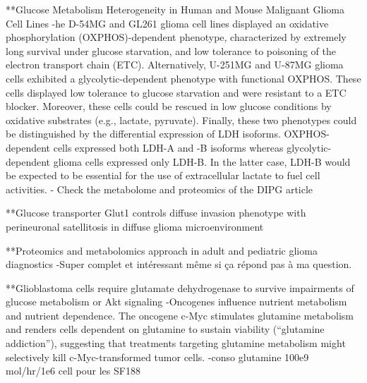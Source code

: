 \documentclass[11pt,a4paper]{article}
\begin{document}
**Glucose Metabolism Heterogeneity in Human and Mouse Malignant Glioma Cell Lines
-he D-54MG and GL261 glioma cell lines displayed an oxidative phosphorylation (OXPHOS)-dependent phenotype, characterized by extremely long survival under glucose starvation, and low tolerance to poisoning of the electron transport chain (ETC). Alternatively, U-251MG and U-87MG glioma cells exhibited a glycolytic-dependent phenotype with functional OXPHOS. These cells displayed low tolerance to glucose starvation and were resistant to a ETC blocker. Moreover, these cells could be rescued in low glucose conditions by oxidative substrates (e.g., lactate, pyruvate). Finally, these two phenotypes could be distinguished by the differential expression of LDH isoforms. OXPHOS-dependent cells expressed both LDH-A and -B isoforms whereas glycolytic-dependent glioma cells expressed only LDH-B. In the latter case, LDH-B would be expected to be essential for the use of extracellular lactate to fuel cell activities. 
- Check the metabolome and proteomics of the DIPG article

**Glucose transporter Glut1 controls diffuse invasion phenotype with perineuronal satellitosis in diffuse glioma microenvironment


**Proteomics and metabolomics approach in adult and pediatric glioma diagnostics 
-Super complet et intéressant même si ça répond pas à ma question.

**Glioblastoma cells require glutamate dehydrogenase to survive impairments of glucose metabolism or Akt signaling
-Oncogenes influence nutrient metabolism and nutrient dependence. The oncogene c-Myc stimulates glutamine metabolism and renders cells dependent on glutamine to sustain viability (“glutamine addiction”), suggesting that treatments targeting glutamine metabolism might selectively kill c-Myc-transformed tumor cells.
-conso glutamine 100e9 mol/hr/1e6 cell pour les SF188
\end{document}
